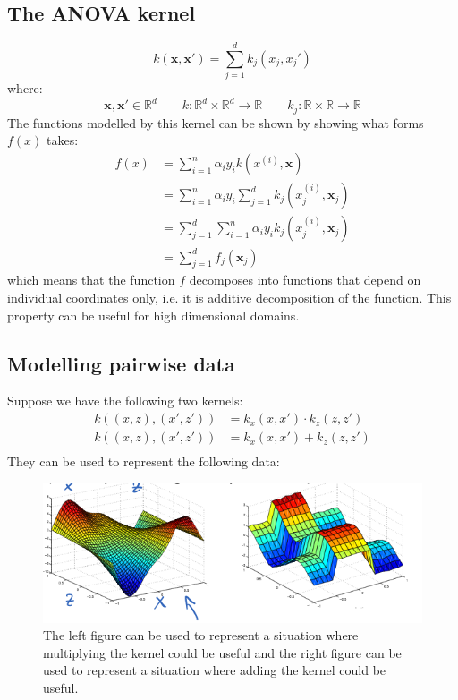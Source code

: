 \documentclass[a4paper,10pt,twoside]{article}
\begin{document}
\subsection{The ANOVA kernel}
\begin{equation*}
    k(\mathbf{x}, \mathbf{x}')=\sum_{j=1}^{d}k_j(x_j, x_j')
\end{equation*}
where:
\begin{equation*}
    \mathbf{x}, \mathbf{x}'\in\mathbb{R}^d\qquad k:\mathbb{R}^d\times\mathbb{R}^d\rightarrow \mathbb{R}\qquad  k_j:\mathbb{R}\times\mathbb{R}\rightarrow\mathbb{R}
\end{equation*}
The functions modelled by this kernel can be shown by showing what forms $f(x)$ takes:
\begin{align*}
    f(x) &= \sum_{i=1}^{n}\alpha_i y_i k(x^(i),\mathbf{x})\\
    &= \sum_{i=1}^{n}\alpha_i y_i \sum_{j=1}^{d}k_j(x^(i)_j,\mathbf{x}_j)\\
    &= \sum_{j=1}^{d}\sum_{i=1}^{n}\alpha_i y_i k_j(x^(i)_j,\mathbf{x}_j)\\
    &= \sum_{j=1}^{d}f_j(\mathbf{x}_j)
\end{align*}
which means that the function $f$ decomposes into functions that depend on individual coordinates only, i.e. it is additive decomposition of the function. This property can be useful for high dimensional domains.

\subsection{Modelling pairwise data}

Suppose we have the following two kernels:
\begin{align}
    k((x,z),(x', z')) &= k_x(x,x')\cdot k_z(z,z')\\
    k((x,z),(x', z')) &= k_x(x,x') + k_z(z,z')\\
\end{align}
They can be used to represent the following data:
\begin{figure}[htbp]
    \centering
    \includegraphics[width=.8\textwidth]{figures/additive_and_multiplicative_effects_of_kernels.png}
    \caption{The left figure can be used to represent a situation where multiplying the kernel could be useful and the right figure can be used to represent a situation where adding the kernel could be useful.}
    \label{additive_and_multiplicative_effects_of_kernels}
\end{figure}
\end{document}
